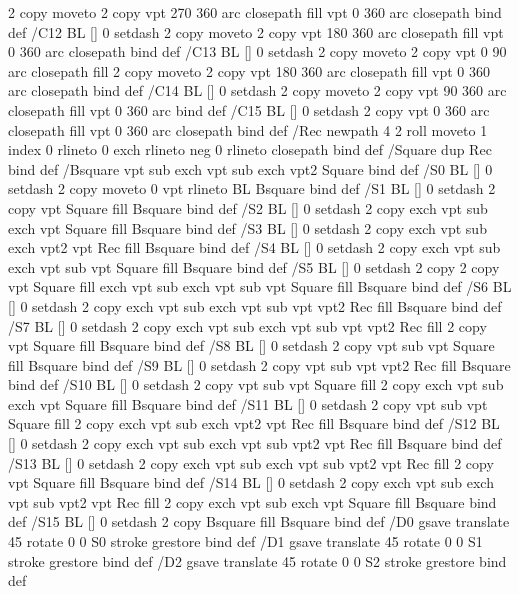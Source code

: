 {{{       2 copy moveto
       2 copy  vpt 270 360 arc closepath fill
               vpt 0 360 arc closepath } bind def
/C12 { BL [] 0 setdash 2 copy moveto
       2 copy  vpt 180 360 arc closepath fill
               vpt 0 360 arc closepath } bind def
/C13 { BL [] 0 setdash  2 copy moveto
       2 copy  vpt 0 90 arc closepath fill
       2 copy moveto
       2 copy  vpt 180 360 arc closepath fill
               vpt 0 360 arc closepath } bind def
/C14 { BL [] 0 setdash 2 copy moveto
       2 copy  vpt 90 360 arc closepath fill
               vpt 0 360 arc } bind def
/C15 { BL [] 0 setdash 2 copy vpt 0 360 arc closepath fill
               vpt 0 360 arc closepath } bind def
/Rec   { newpath 4 2 roll moveto 1 index 0 rlineto 0 exch rlineto
       neg 0 rlineto closepath } bind def
/Square { dup Rec } bind def
/Bsquare { vpt sub exch vpt sub exch vpt2 Square } bind def
/S0 { BL [] 0 setdash 2 copy moveto 0 vpt rlineto BL Bsquare } bind def
/S1 { BL [] 0 setdash 2 copy vpt Square fill Bsquare } bind def
/S2 { BL [] 0 setdash 2 copy exch vpt sub exch vpt Square fill Bsquare } bind def
/S3 { BL [] 0 setdash 2 copy exch vpt sub exch vpt2 vpt Rec fill Bsquare } bind def
/S4 { BL [] 0 setdash 2 copy exch vpt sub exch vpt sub vpt Square fill Bsquare } bind def
/S5 { BL [] 0 setdash 2 copy 2 copy vpt Square fill
       exch vpt sub exch vpt sub vpt Square fill Bsquare } bind def
/S6 { BL [] 0 setdash 2 copy exch vpt sub exch vpt sub vpt vpt2 Rec fill Bsquare } bind def
/S7 { BL [] 0 setdash 2 copy exch vpt sub exch vpt sub vpt vpt2 Rec fill
       2 copy vpt Square fill
       Bsquare } bind def
/S8 { BL [] 0 setdash 2 copy vpt sub vpt Square fill Bsquare } bind def
/S9 { BL [] 0 setdash 2 copy vpt sub vpt vpt2 Rec fill Bsquare } bind def
/S10 { BL [] 0 setdash 2 copy vpt sub vpt Square fill 2 copy exch vpt sub exch vpt Square fill
       Bsquare } bind def
/S11 { BL [] 0 setdash 2 copy vpt sub vpt Square fill 2 copy exch vpt sub exch vpt2 vpt Rec fill
       Bsquare } bind def
/S12 { BL [] 0 setdash 2 copy exch vpt sub exch vpt sub vpt2 vpt Rec fill Bsquare } bind def
/S13 { BL [] 0 setdash 2 copy exch vpt sub exch vpt sub vpt2 vpt Rec fill
       2 copy vpt Square fill Bsquare } bind def
/S14 { BL [] 0 setdash 2 copy exch vpt sub exch vpt sub vpt2 vpt Rec fill
       2 copy exch vpt sub exch vpt Square fill Bsquare } bind def
/S15 { BL [] 0 setdash 2 copy Bsquare fill Bsquare } bind def
/D0 { gsave translate 45 rotate 0 0 S0 stroke grestore } bind def
/D1 { gsave translate 45 rotate 0 0 S1 stroke grestore } bind def
/D2 { gsave translate 45 rotate 0 0 S2 stroke grestore } bind def
}}
